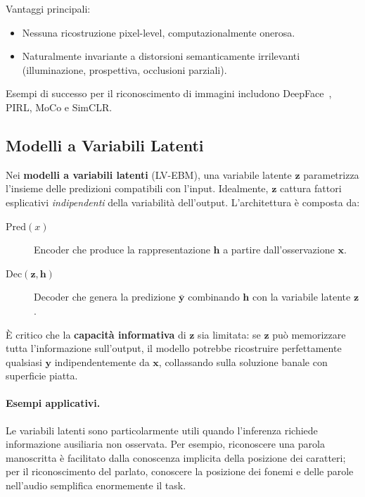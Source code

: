 Vantaggi principali:
\begin{itemize}
  \item Nessuna ricostruzione pixel-level, computazionalmente onerosa.
  \item Naturalmente invariante a distorsioni semanticamente irrilevanti
        (illuminazione, prospettiva, occlusioni parziali).
\end{itemize}

Esempi di successo per il riconoscimento di immagini includono
DeepFace~\citep{taigman2014deepface}, PIRL, MoCo e SimCLR.

\subsection{Modelli a Variabili Latenti}
\label{subsec:latent-variable-ebm}

Nei \textbf{modelli a variabili latenti} (LV-EBM), una variabile latente
$\mathbf{z}$ parametrizza l'insieme delle predizioni compatibili con
l'input. Idealmente, $\mathbf{z}$ cattura fattori esplicativi
\emph{indipendenti} della variabilità dell'output. L'architettura è
composta da:

\begin{description}
  \item[$\text{Pred}(x)$] Encoder che produce la rappresentazione
        $\mathbf{h}$ a partire dall'osservazione $\mathbf{x}$.
  \item[$\text{Dec}(\mathbf{z}, \mathbf{h})$] Decoder che genera la
        predizione $\bar{\mathbf{y}}$ combinando $\mathbf{h}$ con la
        variabile latente $\mathbf{z}$.
\end{description}

È critico che la \textbf{capacità informativa} di $\mathbf{z}$ sia
limitata: se $\mathbf{z}$ può memorizzare tutta l'informazione
sull'output, il modello potrebbe ricostruire perfettamente qualsiasi
$\mathbf{y}$ indipendentemente da $\mathbf{x}$, collassando sulla
soluzione banale con superficie piatta.

\paragraph{Esempi applicativi.}
Le variabili latenti sono particolarmente utili quando l'inferenza richiede
informazione ausiliaria non osservata. Per esempio, riconoscere una parola
manoscritta è facilitato dalla conoscenza implicita della posizione dei
caratteri; per il riconoscimento del parlato, conoscere la posizione dei
fonemi e delle parole nell'audio semplifica enormemente il task.

